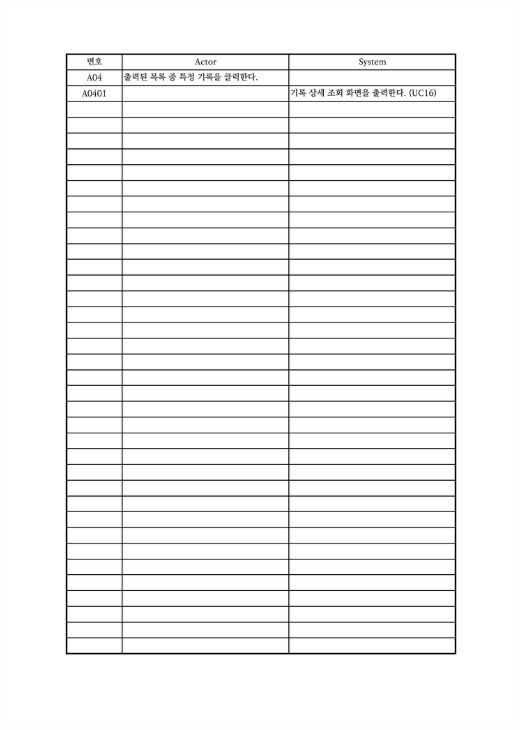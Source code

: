 {{{{{{{{{{{{{{{{{{{{{{{{{{{{{{{{{{{{{{{{{\includegraphics[width=1.1\textwidth]{./Figure/Design/Display/usecase/038-2.pdf} \\
}}}}}}}}}}}}}}}}}}}}}}}}}}}}}}}}}}}}}}}}}
